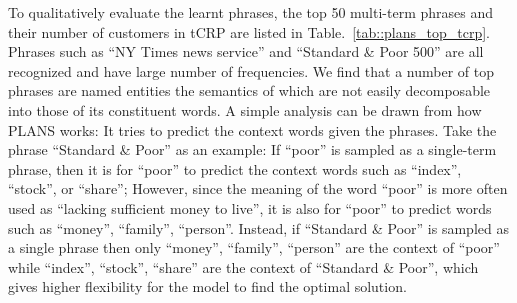 To qualitatively evaluate the learnt phrases, the top 50 multi-term phrases and
their number of customers in tCRP are listed in
Table.~\ref{tab::plans_top_tcrp}. Phrases such as ``NY Times news service'' and
``Standard \& Poor 500'' are all recognized and have large number of
frequencies. We find that a number of top phrases are named entities the semantics of
which are not easily decomposable into those of its constituent words. A simple
analysis can be drawn from how PLANS works: It tries to predict the context
words given the phrases. Take the phrase ``Standard \& Poor'' as an example: If
``poor'' is sampled as a single-term phrase, then it is for ``poor'' to predict
the context words such as ``index'', ``stock'', or ``share''; However, since the
meaning of the word ``poor'' is more often used as ``lacking sufficient money to
live'', it is also for ``poor'' to predict words such as ``money'', ``family'',
``person''. Instead, if ``Standard \& Poor'' is sampled as a single phrase then
only ``money'', ``family'', ``person'' are the context of ``poor'' while
``index'', ``stock'', ``share'' are the context of ``Standard \& Poor'', which
gives higher flexibility for the model to find the optimal solution.

